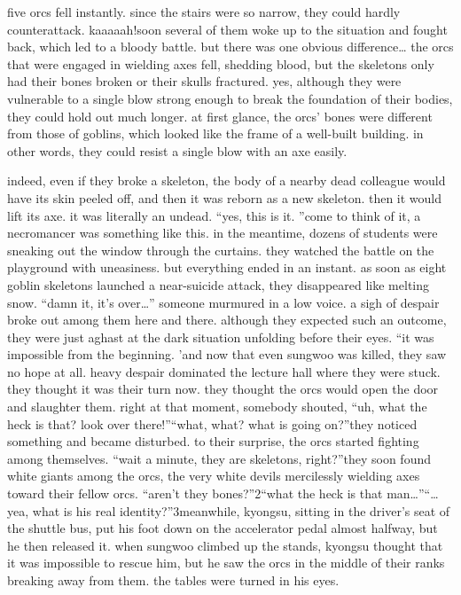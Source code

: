  five orcs fell instantly.
 since the stairs were so narrow, they could hardly counterattack.
kaaaaah!soon several of them woke up to the situation and fought back, which led to a bloody battle.
but there was one obvious difference… the orcs that were engaged in wielding axes fell, shedding blood, but the skeletons only had their bones broken or their skulls fractured.
yes, although they were vulnerable to a single blow strong enough to break the foundation of their bodies, they could hold out much longer.
at first glance, the orcs’ bones were different from those of goblins, which looked like the frame of a well-built building.
 in other words, they could resist a single blow with an axe easily.

indeed, even if they broke a skeleton, the body of a nearby dead colleague would have its skin peeled off, and then it was reborn as a new skeleton.
 then it would lift its axe.
it was literally an undead.
“yes, this is it.
”come to think of it, a necromancer was something like this.
in the meantime, dozens of students were sneaking out the window through the curtains.
they watched the battle on the playground with uneasiness.
but everything ended in an instant.
 as soon as eight goblin skeletons launched a near-suicide attack, they disappeared like melting snow.
“damn it, it’s over…” someone murmured in a low voice.
 a sigh of despair broke out among them here and there.
although they expected such an outcome, they were just aghast at the dark situation unfolding before their eyes.
“it was impossible from the beginning.
’and now that even sungwoo was killed, they saw no hope at all.
 heavy despair dominated the lecture hall where they were stuck.
 they thought it was their turn now.
 they thought the orcs would open the door and slaughter them.
right at that moment, somebody shouted, “uh, what the heck is that? look over there!”“what, what? what is going on?”they noticed something and became disturbed.
 to their surprise, the orcs started fighting among themselves.
“wait a minute, they are skeletons, right?”they soon found white giants among the orcs, the very white devils mercilessly wielding axes toward their fellow orcs.
“aren’t they bones?”2“what the heck is that man…”“…yea, what is his real identity?”3meanwhile, kyongsu, sitting in the driver’s seat of the shuttle bus, put his foot down on the accelerator pedal almost halfway, but he then released it.
 when sungwoo climbed up the stands, kyongsu thought that it was impossible to rescue him, but he saw the orcs in the middle of their ranks breaking away from them.
the tables were turned in his eyes.
